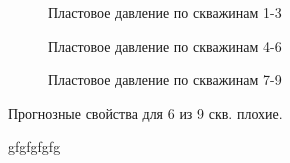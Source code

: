 \documentclass[14pt]{article}
\begin{document}
	\begin{figure}
		\caption{Пластовое давление по скважинам 1-3}
		\label{fig:2.1_3_ex}
	\end{figure}
	
	\begin{figure}
		\caption{Пластовое давление по скважинам 4-6}
		\label{fig:2.4_6_ex}
	\end{figure}
	
	\begin{figure}
		\caption{Пластовое давление по скважинам 7-9}
		\label{fig:2.7_9_ex}
	\end{figure}
	Прогнозные свойства для 6 из 9 скв. плохие.
	
	\newpage
	gfgfgfgfg
	\newpage
	
\end{document}

